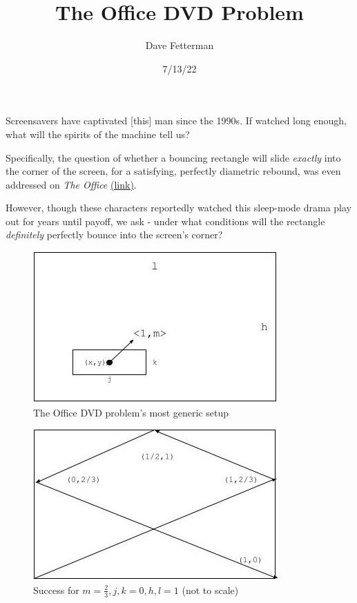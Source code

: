 \documentclass[11pt, oneside]{article} 	%
\title{The Office DVD Problem}
\author{Dave Fetterman}
\affil{Obviously Unemployed}
\date{7/13/22}
\begin{document}
\maketitle

Screensavers have captivated [this] man since the 1990s. If watched long enough, what will the spirits of the machine tell us?

Specifically, the question of whether a bouncing rectangle will slide \emph{exactly} into the corner of the screen, for a satisfying, perfectly diametric rebound, was even addressed on \emph{The Office}
\href{https://www.youtube.com/watch?v=QOtuX0jL85Y}{(link)}.

However, though these characters reportedly watched this sleep-mode drama play out for years until payoff, we ask - under what conditions will the rectangle \emph{definitely} perfectly bounce into the screen's corner?
 
\begin{figure}
\centering
\includegraphics[scale=.5]{setup}
\caption{The Office DVD problem's most generic setup}
\end{figure}


\begin{figure}[!htb]
\centering
\includegraphics[scale=.5]{problem1trajectory}
 \caption{Success for $m = \frac{2}{3}, j, k = 0, h, l = 1$ (not to scale)}
\end{figure}
\end{document}
